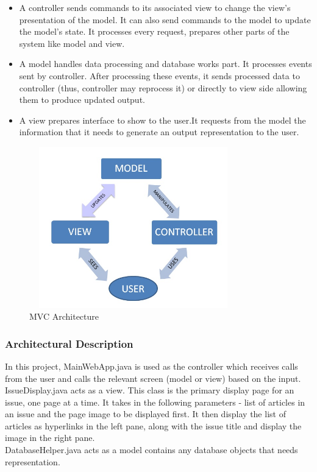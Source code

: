 \documentclass[12pt]{article}
\begin{document}
\begin{itemize}
\item A controller sends commands to its associated view to change the view's presentation of the model. It can also send commands to the model to update the model's state. It processes every request, prepares other parts of the system like model and view.

\item A model handles data processing and database works part. It processes events sent by controller. After processing these events, it sends processed data to controller (thus, controller may reprocess it) or directly to view side allowing them to produce updated output.

\item A view prepares interface to show to the user.It requests from the model the information that it needs to generate an output representation to the user.\\
\end{itemize}
\begin{figure}[ht!]
\centering
\includegraphics[width=9cm,height=7cm]{mvc1.jpg}
\caption{MVC Architecture}
\label{fig:4}
\end{figure}

\subsubsection{Architectural Description}
In this project, MainWebApp.java is used as the controller which receives calls from the user and calls the relevant screen (model or view) based on the input.\\
IssueDisplay.java acts as a view. This class is the primary display page for an issue, one page at a time.  It takes in the following parameters - list of articles in an issue and the page image to be displayed first.
It then display the list of articles as hyperlinks in the left pane, along with the issue title and display the image in the right pane. \\
DatabaseHelper.java acts as a model contains any database objects that needs representation.
\end{document}
